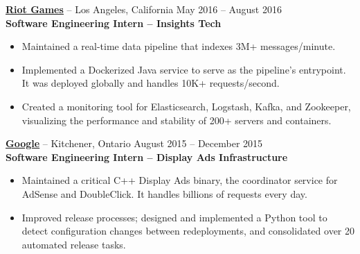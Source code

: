 \documentclass{letter}
\begin{document}
\vspace{-1.5mm}
{\bfseries \href{http://riotgames.com}{\uline{Riot Games}}} -- Los Angeles,
California \hfill May 2016 -- August 2016\\
{\bfseries Software Engineering Intern -- Insights Tech}
\vspace{-3mm}
\begin{itemize}
    \item Maintained a real-time data pipeline that indexes 3M+ messages/minute.
    \item Implemented a Dockerized Java service to serve as the pipeline's
      entrypoint. It was deployed globally and handles 10K+ requests/second.
    \item Created a monitoring tool for Elasticsearch, Logstash, Kafka, and
      Zookeeper, visualizing the performance and stability of 200+ servers and
      containers.
\end{itemize}

\vspace{-1.5mm}
{\bfseries \href{https://www.google.com}{\uline{Google}}} -- Kitchener, Ontario \hfill August 2015 -- December 2015\\
{\bfseries Software Engineering Intern -- Display Ads Infrastructure}
\vspace{-3mm}
\begin{itemize}
    \item Maintained a critical C++ Display Ads binary, the coordinator service
      for AdSense and DoubleClick. It handles billions of requests every day.
    \item Improved release processes; designed and implemented a Python tool to
        detect configuration changes between redeployments, and consolidated
        over 20 automated release tasks.
\end{itemize}
\end{document}
